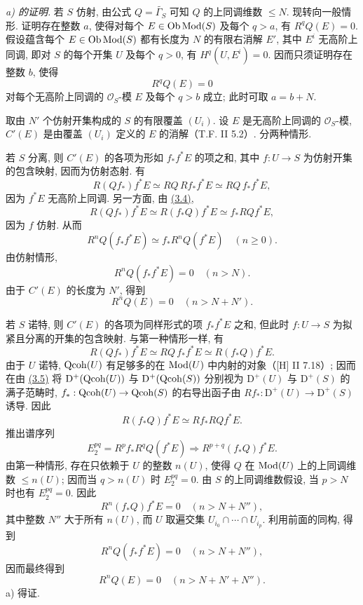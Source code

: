 \emph{a) 的证明.} 若 $S$ 仿射, 由公式 $Q=\widetilde{\Gamma_S}$ 可知 $Q$ 的上同调维数 $\leq N$. 现转向一般情形. 证明存在整数 $a$, 使得对每个 $E\in\operatorname{Ob}\operatorname{Mod}(S)$ 及每个 $q>a$, 有 $R^qQ(E)=0$. 假设蕴含每个 $E\in\operatorname{Ob}\operatorname{Mod}(S)$ 都有长度为 $N$ 的有限右消解 $E'$, 其中 $E^i$ 无高阶上同调, 即对 $S$ 的每个开集 $U$ 及每个 $q>0$, 有 $H^q(U,E^i)=0$. 因而只须证明存在整数 $b$, 使得
\[
 R^qQ(E)=0
\]
对每个无高阶上同调的 $\mathcal O_S$-模 $E$ 及每个 $q>b$ 成立; 此时可取 $a=b+N$.

取由 $N'$ 个仿射开集构成的 $S$ 的有限覆盖 $(U_i)$. 设 $E$ 是无高阶上同调的 $\mathcal O_S$-模, $C'(E)$ 是由覆盖 $(U_i)$ 定义的 $E$ 的消解（T.F. II 5.2）. 分两种情形.

若 $S$ 分离, 则 $C'(E)$ 的各项为形如 $f_*f^*E$ 的项之和, 其中 $f:U\to S$ 为仿射开集的包含映射, 因而为仿射态射. 有
\[
 R(Qf_*)f^*E\simeq RQ\,Rf_*f^*E\simeq RQ\,f_*f^*E,
\]
因为 $f^*E$ 无高阶上同调. 另一方面, 由 \hyperlink{sga6.e02.lem.3-4}{(3.4)},
\[
 R(Qf_*)f^*E\simeq R(f_*Q)f^*E\simeq f_*RQf^*E,
\]
因为 $f$ 仿射. 从而
\[
 R^nQ(f_*f^*E)\simeq f_*R^nQ(f^*E)\quad(n\geq0).
\]
由仿射情形,
\[
 R^nQ(f_*f^*E)=0\quad(n>N).
\]
由于 $C'(E)$ 的长度为 $N'$, 得到
\[
 R^nQ(E)=0\quad(n>N+N').
\]

若 $S$ 诺特, 则 $C'(E)$ 的各项为同样形式的项 $f_*f^*E$ 之和, 但此时 $f:U\to S$ 为拟紧且分离的开集的包含映射. 与第一种情形一样, 有
\[
 R(Qf_*)f^*E\simeq RQ\,f_*f^*E\simeq R(f_*Q)f^*E.
\tag{*}
\]
由于 $U$ 诺特, $\operatorname{Qcoh}(U)$ 有足够多的在 $\operatorname{Mod}(U)$ 中内射的对象（[H] II 7.18）; 因而在由 \hyperlink{sga6.e02.prop.3-5}{(3.5)} 将 $\mathrm D^+(\operatorname{Qcoh}(U))$ 与 $\mathrm D^+(\operatorname{Qcoh}(S))$ 分别视为 $\mathrm D^+(U)$ 与 $\mathrm D^+(S)$ 的满子范畴时, $f_*:\operatorname{Qcoh}(U)\to\operatorname{Qcoh}(S)$ 的右导出函子由 $Rf_*:\mathrm D^+(U)\to\mathrm D^+(S)$ 诱导. 因此
\[
 R(f_*Q)f^*E\simeq Rf_*RQf^*E.
\]
推出谱序列
\[
 E_2^{pq}=R^pf_*R^qQ(f^*E)\Longrightarrow R^{p+q}(f_*Q)f^*E.
\]
由第一种情形, 存在只依赖于 $U$ 的整数 $n(U)$, 使得 $Q$ 在 $\operatorname{Mod}(U)$ 上的上同调维数 $\leq n(U)$; 因而当 $q>n(U)$ 时 $E_2^{pq}=0$. 由 $S$ 的上同调维数假设, 当 $p>N$ 时也有 $E_2^{pq}=0$. 因此
\[
 R^n(f_*Q)f^*E=0\quad(n>N+N''),
\]
其中整数 $N''$ 大于所有 $n(U)$, 而 $U$ 取遍交集 $U_{i_0}\cap\cdots\cap U_{i_p}$. 利用前面的同构, 得到
\[
 R^nQ(f_*f^*E)=0\quad(n>N+N''),
\]
因而最终得到
\[
 R^nQ(E)=0\quad(n>N+N'+N'').
\]
a) 得证.


